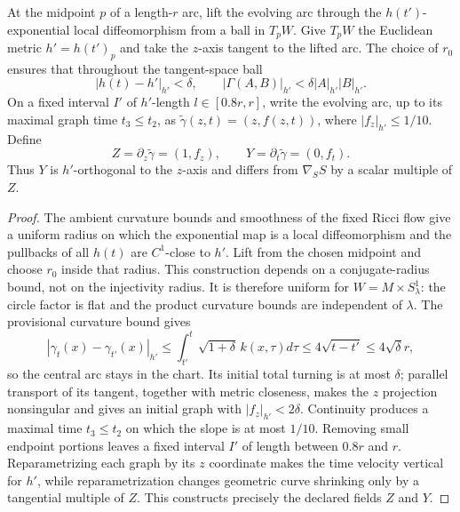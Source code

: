 \begin{definition}
\label{def:curve-flow-local-graph-coordinates}
\notready
At the midpoint $p$ of a length-$r$ arc, lift the evolving arc through the
$h(t')$-exponential local diffeomorphism from a ball in $T_pW$.  Give
$T_pW$ the Euclidean metric $h'=h(t')_p$ and take the $z$-axis tangent to the
lifted arc.  The choice of $r_0$ ensures that throughout the tangent-space
ball
\[
 |h(t)-h'|_{h'}<\delta,\qquad
 |\Gamma(A,B)|_{h'}<\delta|A|_{h'}|B|_{h'}.
\]
On a fixed interval $I'$ of $h'$-length $l\in[0.8r,r]$, write the evolving
arc, up to its maximal graph time $t_3\le t_2$, as
$\widetilde\gamma(z,t)=(z,f(z,t))$, where $|f_z|_{h'}\le1/10$.  Define
\[
 Z=\partial_z\widetilde\gamma=(1,f_z),\qquad
 Y=\partial_t\widetilde\gamma=(0,f_t).
\]
Thus $Y$ is $h'$-orthogonal to the $z$-axis and differs from
$\nabla_SS$ by a scalar multiple of $Z$.
\end{definition}
\begin{proof}
The ambient curvature bounds and smoothness of the fixed Ricci flow give a
uniform radius on which the exponential map is a local diffeomorphism and the
pullbacks of all $h(t)$ are $C^1$-close to $h'$.  Lift from the chosen
midpoint and choose $r_0$ inside that radius.  This construction depends on a
conjugate-radius bound, not on the injectivity radius.  It is therefore uniform
for $W=M\times S^1_\lambda$: the circle factor is flat and the product
curvature bounds are independent of $\lambda$.  The provisional curvature
bound gives
\[
 |\gamma_t(x)-\gamma_{t'}(x)|_{h'}
 \le\int_{t'}^t\sqrt{1+\delta}\,k(x,\tau)d\tau
 \le4\sqrt{t-t'}\le4\sqrt\delta r,
\]
so the central arc stays in the chart.  Its initial total turning is at most
$\delta$; parallel transport of its tangent, together with metric closeness,
makes the $z$ projection nonsingular and gives an initial graph with
$|f_z|_{h'}<2\delta$.  Continuity produces a maximal time $t_3\le t_2$ on
which the slope is at most $1/10$.  Removing small endpoint portions leaves a
fixed interval $I'$ of length between $0.8r$ and $r$.  Reparametrizing each
graph by its $z$ coordinate makes the time velocity vertical for $h'$, while
reparametrization changes geometric curve shrinking only by a tangential
multiple of $Z$.  This constructs precisely the declared fields $Z$ and $Y$.
\end{proof}

